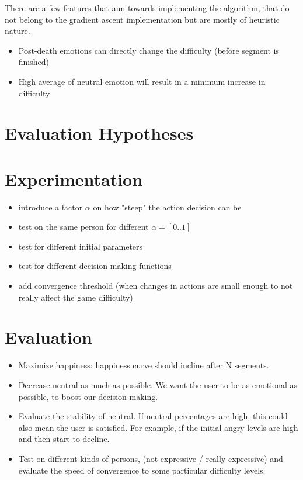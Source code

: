 \documentclass[11pt]{article}
\begin{document}
There are a few features that aim towards implementing the algorithm, that do not belong to the gradient ascent implementation but are mostly of heuristic nature.
\begin{itemize}
\item Post-death emotions can directly change the difficulty (before segment is finished)
\item High average of neutral emotion will result in a minimum increase in difficulty
\end{itemize}

\section{Evaluation Hypotheses}


\section{Experimentation}
\begin{itemize}
\item introduce a factor $\alpha$ on how "steep" the action decision can be
\item test on the same person for different $\alpha = [0..1]$
\item test for different initial parameters
\item test for different decision making functions
\item add convergence threshold (when changes in actions are small enough to not really affect the game difficulty)
\end{itemize}

\section{Evaluation}


\begin{itemize}
\item Maximize happiness: happiness curve should incline after N segments.
\item Decrease neutral as much as possible. We want the user to be as emotional as possible, to boost our decision making.
\item Evaluate the stability of neutral. If neutral percentages are high, this could also mean the user is satisfied. For example, if the initial angry levels are high and then start to decline.
\item Test on different kinds of persons, (not expressive / really expressive) and evaluate the speed of convergence to some particular difficulty levels.

\end{itemize}
\end{document}
